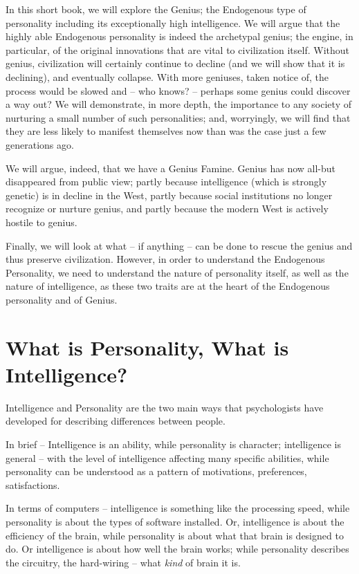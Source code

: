 \documentclass[
]{book}
\begin{document}
In this short book, we will explore the Genius; the Endogenous type of personality including its exceptionally high intelligence. We will argue that the highly able Endogenous personality is indeed the archetypal genius; the engine, in particular, of the original innovations that are vital to civilization itself. Without genius, civilization will certainly continue to decline (and we will show that it is declining), and eventually collapse. With more geniuses, taken notice of, the process would be slowed and -- who knows? -- perhaps some genius could discover a way out?
We will demonstrate, in more depth, the importance to any society of nurturing a small number of such personalities; and, worryingly, we will find that they are less likely to manifest themselves now than was the case just a few generations ago.

We will argue, indeed, that we have a Genius Famine. Genius has now all-but disappeared from public view; partly because intelligence (which is strongly genetic) is in decline in the West, partly because social institutions no longer recognize or nurture genius, and partly because the modern West is actively hostile to genius.

Finally, we will look at what -- if anything -- can be done to rescue the genius and thus preserve civilization.
However, in order to understand the Endogenous Personality, we need to understand the nature of personality itself, as well as the nature of intelligence, as these two traits are at the heart of the Endogenous personality and of Genius.

\hypertarget{what-is-personality-what-is-intelligence}{%
\chapter{What is Personality, What is Intelligence?}\label{what-is-personality-what-is-intelligence}}

Intelligence and Personality are the two main ways that psychologists have developed for describing differences between people.

In brief -- Intelligence is an ability, while personality is character; intelligence is general -- with the level of intelligence affecting many specific abilities, while personality can be understood as a pattern of motivations, preferences, satisfactions.

In terms of computers -- intelligence is something like the processing speed, while personality is about the types of software installed. Or, intelligence is about the efficiency of the brain, while personality is about what that brain is designed to do. Or intelligence is about how well the brain works; while personality describes the circuitry, the hard-wiring -- what \emph{kind} of brain it is.
\end{document}
